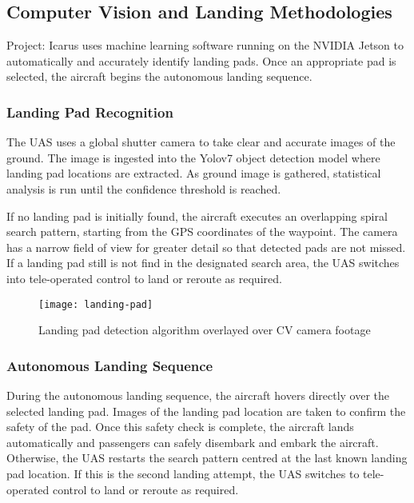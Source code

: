 \subsection{Computer Vision and Landing Methodologies}
\label{sec:cv-and-landing}

Project: Icarus uses machine learning software running on the NVIDIA Jetson to
automatically and accurately identify landing pads. Once an appropriate pad is
selected, the aircraft begins the autonomous landing sequence.

\subsubsection{Landing Pad Recognition}

The UAS uses a global shutter camera to take clear and accurate images of the
ground. The image is ingested into the Yolov7 object detection model where
landing pad locations are extracted. As ground image is gathered, statistical
analysis is run until the confidence threshold is reached.

If no landing pad is initially found, the aircraft executes an overlapping
spiral search pattern, starting from the GPS coordinates of the waypoint. The
camera has a narrow field of view for greater detail so that detected pads are
not missed. If a landing pad still is not find in the designated search area,
the UAS switches into tele-operated control to land or reroute as required.

\begin{figure}[H]
        \centering
        \texttt{[image: landing-pad]}
		\caption{Landing pad detection algorithm overlayed over CV camera
		footage}
\end{figure}

\subsubsection{Autonomous Landing Sequence}
\label{sec:landing-sequence}

During the autonomous landing sequence, the aircraft hovers directly over the
selected landing pad. Images of the landing pad location are taken to confirm
the safety of the pad. Once this safety check is complete, the aircraft lands
automatically and passengers can safely disembark and embark the aircraft.
Otherwise, the UAS restarts the search pattern centred at the last known
landing pad location. If this is the second landing attempt, the UAS switches
to tele-operated control to land or reroute as required.

